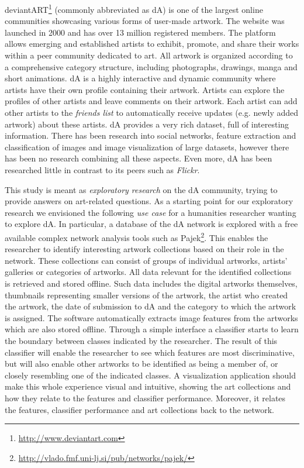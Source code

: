 deviantART\footnote{\url{http://www.deviantart.com}} (commonly abbreviated as dA) is one of the largest online communities showcasing various forms of user-made artwork.
The website was launched in 2000 and has over 13 million registered members.
The platform allows emerging and established artists to exhibit, promote, and share their works within a peer community dedicated to art.
All artwork is organized according to a comprehensive category structure, including photographs, drawings, manga and short animations.
dA is a highly interactive and dynamic community where artists have their own profile containing their artwork.
Artists can explore the profiles of other artists and leave comments on their artwork.
Each artist can add other artists to the \textit{friends list} to automatically receive updates (e.g. newly added artwork) about these artists.
dA provides a very rich dataset, full of interesting information. 
There has been research into social networks, feature extraction and classification of images and image visualization of large datasets, however there has been no research combining all these aspects.
Even more, dA has been researched little in contrast to its peers such as \textit{Flickr}.

This study is meant as \textit{exploratory research} on the dA community, trying to provide answers on art-related questions.
As a starting point for our exploratory research we envisioned the following \textit{use case} for a humanities researcher wanting to explore dA. In particular, a database of the dA network is explored with a free available complex network analysis tools such as Pajek\footnote{\url{http://vlado.fmf.uni-lj.si/pub/networks/pajek/}}. This enables the researcher to identify interesting artwork collections based on their role in the network. These collections can consist of groups of individual artworks, artists' galleries or categories of artworks.  All data relevant for the identified collections is retrieved and stored offline. Such data includes the digital artworks themselves, thumbnails representing smaller versions of the artwork, the artist who created the artwork, the date of submission to dA and the category to which the artwork is assigned. The software automatically extracts image features from the artworks which are also stored offline. Through a simple interface a classifier starts to learn the boundary between classes indicated by the researcher. The result of this classifier will enable the researcher to see which features are most discriminative, but will also enable other artworks to be identified as being a member of, or closely resembling one of the indicated classes. A visualization application should make this whole experience visual and intuitive, showing the art collections and how they relate to the features and classifier performance. Moreover, it relates the features, classifier performance and art collections back to the network.

